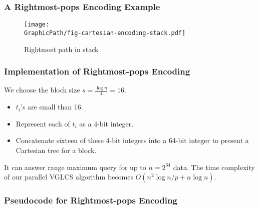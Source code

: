 \begin{withoutheadline}
\begin{frame}
	\frametitle{A Rightmost-pops Encoding Example}
	\begin{figure}[!thb]
	  \centering
	  \texttt{[image: \\GraphicPath/fig-cartesian-encoding-stack.pdf]}
	  \caption{Rightmost path in stack}
	  \label{fig:interval-cartesian}
	\end{figure}
\end{frame}
\end{withoutheadline}

\begin{frame}
	\frametitle{Implementation of Rightmost-pops Encoding}
	We choose the block size $s = {{\frac{\log n}{4}}} = 16$.

	\begin{itemize}	
		\setlength\itemsep{1em}
		\item
			$t_i$'s are small than 16.
		\item
			Represent each of $t_i$ as a 4-bit integer.
		\item
			Concatenate sixteen of these 4-bit integers into a 64-bit
			integer to present a Cartesian tree for a block.
	\end{itemize}
	\vspace{1em}
	It can answer range maximum query for up to $n = 2^{64}$ data.  The
	time complexity of our parallel VGLCS algorithm becomes $O(n^2
	\log{n} / p + n \log n)$.
\end{frame}

\begin{frame}
	\frametitle{Pseudocode for Rightmost-pops Encoding}
	\begin{center}
		\scalebox{1} { \begin{minipage}{1\textwidth}
			
			\end{minipage}
		}
	\end{center}
\end{frame}